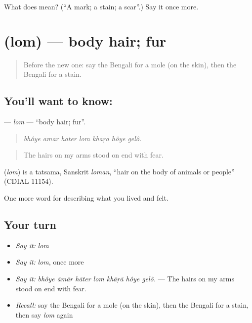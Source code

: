 \begin{tcolorbox}[breakable,colback=teal!4,colframe=teal!35!black,title={Before you move on}]
What does  mean? (\textquotedblleft{}A mark; a stain; a scar\textquotedblright{}.) Say it once more.
\end{tcolorbox}
\section[\texorpdfstring{\bn{লোম} (lom)}{লোম (lom)}]{ (lom) — body hair; fur}

\label{lesson:BN-C469-lom}



\begin{quote}
Before the new one: say the Bengali for a mole (on the skin), then the Bengali for a stain.
\end{quote}

\subsection*{You'll want to know: }
\textbf{} — \emph{lom} — \textquotedblleft{}body hair; fur\textquotedblright{}.

\begin{quote}
      
\end{quote}

\begin{quote}
\emph{bhôye āmār hāter lom khāṛā hôye gelô.}
\end{quote}

\begin{quote}
The hairs on my arms stood on end with fear.
\end{quote}

\begin{cousinweb}
\textbf{} (\emph{lom}) is a tatsama, Sanskrit \emph{loman}, \textquotedblleft{}hair on the body of animals or people\textquotedblright{} (CDIAL 11154).
\end{cousinweb}

\begin{grammarlens}[title={What you've built}]
One more word for describing what you lived and felt.
\end{grammarlens}

\subsection*{Your turn}
\begin{itemize}
\raggedright
  \item \emph{Say it:} \emph{lom}
  \item \emph{Say it:} \emph{lom}, once more
  \item \emph{Say it:} \emph{bhôye āmār hāter lom khāṛā hôye gelô.} — The hairs on my arms stood on end with fear.
  \item \emph{Recall:} say the Bengali for a mole (on the skin), then the Bengali for a stain, then say \emph{lom} again
\end{itemize}

